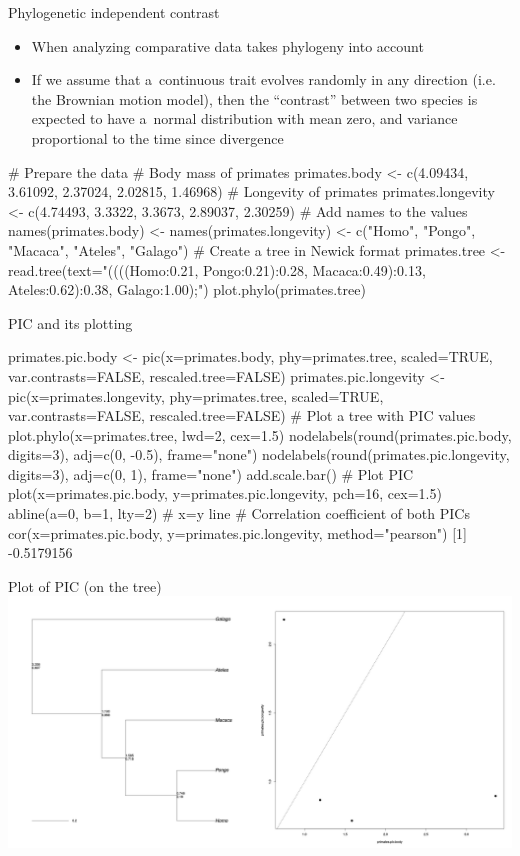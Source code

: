 \documentclass[compress, ucs, xelatex, 11pt, xcolor=svgnames,
  hyperref={
    bookmarks=true,
    unicode=true,
    colorlinks=true,
    pdftitle={Molecular data in R},
    plainpages=false,
    pdfauthor={Vojtech Zeisek},
    pdfsubject={Course about phylogeny and evolution in R},
    pdfcreator={XeLaTeX},
    pdfkeywords={R, evolution, phylogeny, molecular data},
    linkcolor=Tomato,
    anchorcolor=SaddleBrown,
    citecolor=Goldenrod,
    filecolor=DarkMagenta,
    menucolor=Sienna,
    urlcolor=DarkTurquoise,
    pdftex},
  url={hyphens, lowtilde} %
  ]{beamer}
\begin{document}
\begin{frame}[fragile]{Phylogenetic independent contrast}
\begin{itemize}
 \item When analyzing comparative data takes phylogeny into account
 \item If we assume that a~continuous trait evolves randomly in any direction (i.e. the Brownian motion model), then the ``contrast'' between two species is expected to have a~normal distribution with mean zero, and variance proportional to the time since divergence
\end{itemize}
  \begin{spluscode}
    # Prepare the data # Body mass of primates
    primates.body <- c(4.09434, 3.61092, 2.37024, 2.02815, 1.46968)
    # Longevity of primates
    primates.longevity <- c(4.74493, 3.3322, 3.3673, 2.89037, 2.30259)
    # Add names to the values
    names(primates.body) <- names(primates.longevity) <- c("Homo", "Pongo",
      "Macaca", "Ateles", "Galago")
    # Create a tree in Newick format
    primates.tree <- read.tree(text="((((Homo:0.21, Pongo:0.21):0.28,
      Macaca:0.49):0.13, Ateles:0.62):0.38, Galago:1.00);")
    plot.phylo(primates.tree)
  \end{spluscode}
\end{frame}

\begin{frame}[fragile]{PIC and its plotting}
  \begin{spluscode}
    primates.pic.body <- pic(x=primates.body, phy=primates.tree,
      scaled=TRUE, var.contrasts=FALSE, rescaled.tree=FALSE)
    primates.pic.longevity <- pic(x=primates.longevity, phy=primates.tree,
      scaled=TRUE, var.contrasts=FALSE, rescaled.tree=FALSE)
    # Plot a tree with PIC values
    plot.phylo(x=primates.tree, lwd=2, cex=1.5)
    nodelabels(round(primates.pic.body, digits=3), adj=c(0, -0.5),
      frame="none")
    nodelabels(round(primates.pic.longevity, digits=3), adj=c(0, 1),
      frame="none")
    add.scale.bar()
    # Plot PIC
    plot(x=primates.pic.body, y=primates.pic.longevity, pch=16, cex=1.5)
    abline(a=0, b=1, lty=2) # x=y line
    # Correlation coefficient of both PICs
    cor(x=primates.pic.body, y=primates.pic.longevity, method="pearson")
    [1] -0.5179156
  \end{spluscode}
\end{frame}

\begin{frame}{Plot of PIC (on the tree)}
  \includegraphics[width=\textwidth]{pic.png}
\end{frame}
\end{document}
